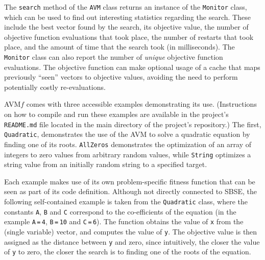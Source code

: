 \documentclass{llncs}
\newcommand{\AVM}{Alternating Variable Method\xspace}
\newcommand{\name}{AVM\hspace{-1pt}$f$\xspace}
\newcommand{\inlineheading}[1]{\vspace{1mm} \noindent {\bf #1.}}
\begin{document}
\begin{sloppypar}
\inlineheading{Reporting} The {\tt search} method of the {\tt AVM} class returns an instance of the {\tt Monitor} class, which can be used to find out interesting statistics regarding the search. These include the best vector found by the search, its objective value, the number of objective function evaluations that took place, the number of restarts that took place, and the amount of time that the search took (in milliseconds). The {\tt Monitor} class can also report the number of {\it unique} objective function evaluations. The objective function can make optional usage of a cache that maps previously ``seen'' vectors to objective values, avoiding the need to perform potentially costly re-evaluations.
\end{sloppypar}

\inlineheading{Examples} \name comes with three accessible examples demonstrating its use. (Instructions on how to compile and run these examples are available in the project's {\tt README.md} file located in the main directory of the project's repository.) The first, {\tt Quadratic}, demonstrates the use of the AVM to solve a quadratic equation by finding one of its roots. {\tt AllZeros} demonstrates the optimization of an array of integers to zero values from arbitrary random values, while {\tt String} optimizes a string value from an initially random string to a specified target.


Each example makes use of its own problem-specific fitness function that can be seen as part of its code definition.  Although not directly connected to SBSE, the following self-contained example is taken from the {\tt Quadratic} class, where the constants {\tt A}, {\tt B} and {\tt C} correspond to the co-efficients of the equation (in the example {\tt A}\,{\tt =}\,{\tt 4}, {\tt B}\,{\tt =}\,{\tt 10} and {\tt C}\,{\tt =}\,{\tt 6}). The function obtains the value of {\tt x} from the (single variable) vector, and computes the value of {\tt y}. The objective value is then assigned as the distance between {\tt y} and zero, since intuitively, the closer the value of {\tt y} to zero, the closer the search is to finding one of the roots of the equation.
\end{document}

